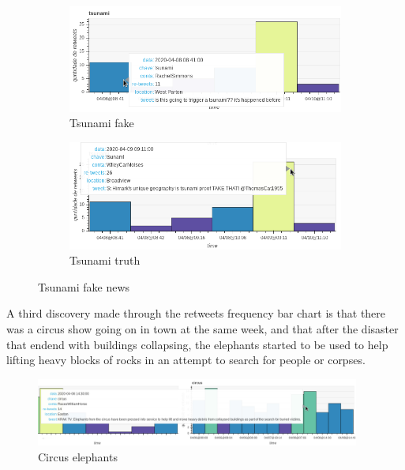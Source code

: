 \begin{figure}[!h]
    \centering
    \begin{subfigure}[!h]{0.47\textwidth}
        \centering
        \includegraphics[width=1.00\textwidth]{figs/q3/re_tsunami_fake.png}
        \caption{Tsunami fake}
        \label{fig:re_tsunami_fake}
    \end{subfigure}
    \begin{subfigure}[!h]{0.47\textwidth}
        \centering
        \includegraphics[width=1.00\textwidth]{figs/q3/re_tsunami_truth.png}
        \caption{Tsunami truth}
        \label{fig:re_tsunami_truth}
    \end{subfigure}
    \caption{Tsunami fake news}
    \label{fig:re_tsunami}
\end{figure}

A third discovery made through the retweets frequency bar chart is that there
was a circus show going on in town at the same week, and that after the disaster
that endend with buildings collapsing, the elephants started to be used to help
lifting heavy blocks of rocks in an attempt to search for people or corpses.

\begin{figure}[!h]
    \centering
    \includegraphics[width=0.95\textwidth]{figs/q3/re_circus.png}
    \caption{Circus elephants}
    \label{fig:re_circus}
\end{figure}

